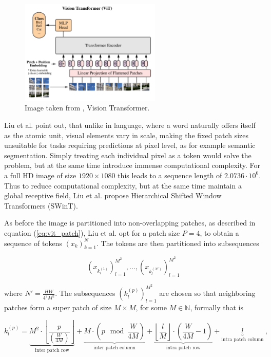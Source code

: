 \begin{figure}[h!]
    \includegraphics[width=0.6\textwidth]{models/preliminaries/imgs/vit.png}
    \caption{Image taken from \cite{dosovitskiyImageWorth16x162021}, Vision Transformer.}
    \label{fig:vit}
\end{figure}

Liu et al. \cite{liuSwinTransformerHierarchical2021} point out,
that unlike in language, where a word naturally offers itself as the atomic unit,
visual elements vary in scale,
making the fixed patch sizes unsuitable for tasks requiring predictions at pixel level,
as for example semantic segmentation. 
Simply treating each individual pixel as a token would solve the problem,
but at the same time introduce immense computational complexity.
For a full HD image of size $1920 \times 1080$ this leads to a sequence length of $2.0736 \cdot 10^{6}$.
Thus to reduce computational complexity,
but at the same time maintain a global receptive field, 
Liu et al. \cite{liuSwinTransformerHierarchical2021} propose Hierarchical Shifted Window Transformers (SWinT).

As before the image is partitioned into non-overlapping patches,
as described in equation (\ref{eq:vit_patch}), 
Liu et al. \cite{liuSwinTransformerHierarchical2021} opt for a patch size $P = 4$,
to obtain a sequence of tokens $(x_k)_{k=1}^N$.
The tokens are then partitioned into subsequences

    \begin{equation*} 
        \left(x_{k^{(1)}_l} \right)_{l=1}^{M^2}, ..., \left(x_{k^{(N')}_l} \right)_{l=1}^{M^2}
    \end{equation*}

where $N' = \frac{HW}{4^2 M^2}$.
The subsequences $(k_l^{(p)})_{l=1}^{M^2}$ are chosen so that neighboring patches form a super patch of size $M \times M$, 
for some $M \in \mathbb N$, formally that is

    \begin{equation} \label{eq:super_partitioning}
        k_l^{(p)} = \underbrace{M^2 \cdot \left \lfloor \frac{p}{\left( \frac{W}{4M} \right)}\right \rfloor}_\text{inter patch row}
        + \underbrace{M \cdot \left( p \mod \frac{W}{4M} \right)}_\text{inter patch column}
        + \underbrace{\left \lfloor \frac{l}{M}\right \rfloor \cdot \left( \frac{W}{4M} - 1 \right)}_\text{intra patch row}
        + \underbrace{l}_\text{intra patch column} ~,
    \end{equation}

